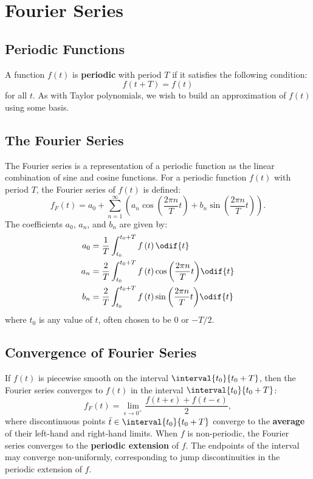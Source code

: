 \documentclass{article}
\begin{document}
\section{Fourier Series}
\subsection{Periodic Functions}
A function \(f\left( t \right)\) is \textbf{periodic} with period \(T\)
if it satisfies the following condition:
\begin{equation*}
    f\left( t + T \right) = f\left( t \right)
\end{equation*}
for all \(t\). As with Taylor polynomials, we wish to build an
approximation of \(f\left( t \right)\) using some basis.
\subsection{The Fourier Series}
The Fourier series is a representation of a periodic function as the
linear combination of sine and cosine functions. For a periodic
function \(f\left( t \right)\) with period \(T\), the Fourier series of
\(f\left( t \right)\) is defined:
\begin{equation*}
    f_F\left( t \right) = a_0 + \sum_{n=1}^{\infty} \left( a_n \cos{\left( \frac{2\pi n}{T} t \right)} + b_n \sin{\left( \frac{2\pi n}{T} t \right)} \right).
\end{equation*}
The coefficients \(a_0\), \(a_n\), and \(b_n\) are given by:
\begin{align*}
    a_0 & = \frac{1}{T} \int_{t_0}^{t_0 + T} f\left( t \right) \odif{t}                                         \\
    a_n & = \frac{2}{T} \int_{t_0}^{t_0 + T} f\left( t \right) \cos{\left( \frac{2\pi n}{T} t \right)} \odif{t} \\
    b_n & = \frac{2}{T} \int_{t_0}^{t_0 + T} f\left( t \right) \sin{\left( \frac{2\pi n}{T} t \right)} \odif{t}
\end{align*}
where \(t_0\) is any value of \(t\), often chosen to be \(0\) or \(-T/2\).
\subsection{Convergence of Fourier Series}
If \(f\left( t \right)\) is piecewise smooth on the interval
\(\interval{t_0}{t_0 + T}\), then the Fourier series converges to
\(f\left( t \right)\) in the interval \(\interval{t_0}{t_0 + T}\):
\begin{equation*}
    f_F\left( t \right) = \lim_{\epsilon \to 0^{+}} \frac{f\left( t + \epsilon \right) + f\left( t - \epsilon \right)}{2},
\end{equation*}
where discontinuous points \(\bar{t} \in
\interval{t_0}{t_0 + T}\) converge to the \textbf{average} of their
left-hand and right-hand limits. When \(f\) is non-periodic, the
Fourier series converges to the \textbf{periodic extension} of \(f\).
The endpoints of the interval may converge non-uniformly, corresponding
to jump discontinuities in the periodic extension of \(f\).
\end{document}
